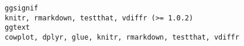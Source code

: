 \documentclass[
  letterpaper,
  DIV=11,
  numbers=noendperiod]{scrreprt}
\begin{document}
\begin{verbatim}
ggsignif                                                                                                                                                                                                                                                                                                                                                                                                                                                                                                                                                                                                                                                                                                                                                                                                                                                                                                                                                                                                                                                                                                                                                                                                                                                        knitr, rmarkdown, testthat, vdiffr (>= 1.0.2)
ggtext                                                                                                                                                                                                                                                                                                                                                                                                                                                                                                                                                                                                                                                                                                                                                                                                                                                                                                                                                                                                                                                                                                                                                                                                                                               cowplot, dplyr, glue, knitr, rmarkdown, testthat, vdiffr

\end{verbatim}
\end{document}
